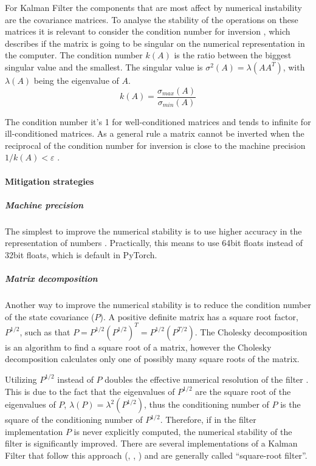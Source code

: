 \documentclass{article}
\begin{document}
For Kalman Filter the components that are most affect by numerical instability are the covariance matrices. To analyse the stability of the operations on these matrices it is relevant to consider the condition number for inversion \cite{mohinder_s_grewal_kalman_2001, kaminski_discrete_1971}, which describes if the matrix is going to be singular on the numerical representation in the computer. The condition number $k(A)$ is the ratio between the biggest singular value and the smallest. The singular value is $\sigma^2(A) = \lambda(AA^T)$, with  $\lambda(A)$ being the eigenvalue of $A$.
\begin{equation}\label{condition_number}
    k(A) = \frac{\sigma_{max}(A)}{\sigma_{min}(A)}
\end{equation}

The condition number it's 1 for well-conditioned matrices and tends to infinite for ill-conditioned matrices. As a general rule  a matrix cannot be inverted when the reciprocal of the condition number for inversion is close to the machine precision $ 1/k(A) < \varepsilon$ \cite{mohinder_s_grewal_kalman_2001}.

\paragraph{Mitigation strategies}

\subparagraph{Machine precision} The simplest to improve the numerical stability is to use higher accuracy in the representation of numbers \cite{dan_simon_optimal_2006}. Practically, this means to use 64bit floats instead of 32bit floats, which is default in PyTorch.

\subparagraph{Matrix decomposition} Another way to improve the numerical stability is to reduce the condition number of the state covariance ($P$). A positive definite matrix has a square root factor, $P^{1/2}$, such as that $P = P^{1/2}(P^{1/2})^T=P^{1/2}(P^{T/2})$.
The Cholesky decomposition is an algorithm to find a square root of a matrix, however the Cholesky decomposition calculates only one of possibly many square roots of the matrix.

Utilizing $P^{1/2}$ instead of $P$ doubles the effective numerical resolution of the filter \cite{kaminski_discrete_1971} \cite{dan_simon_optimal_2006} \cite{rutten_square-root_2013}. This is due to the fact that the eigenvalues of $P^{1/2}$ are the square root of the eigenvalues of $P$, $\lambda(P) = \lambda^2(P^{1/2})$, thus the conditioning number of $P$ is the square of the conditioning number of $P^{1/2}$. Therefore, if in the filter implementation $P$ is never explicitly computed, the numerical stability of the filter is significantly improved.
There are several implementations of a Kalman Filter that follow this approach (\cite{potter_statistical_1963}, \cite{carlson_fast_1973}, \cite{bierman_numerical_1977}) and are generally called ``square-root filter''.
\end{document}
